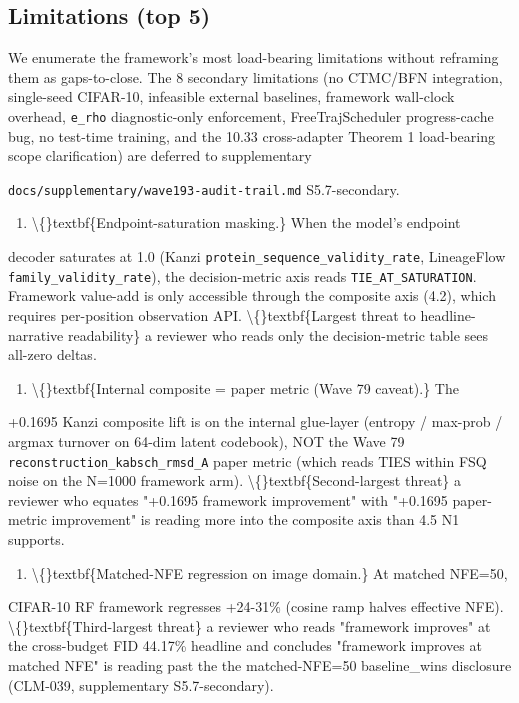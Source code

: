 \documentclass[preprint,3p,times,twocolumn]{elsarticle}
\begin{document}
\subsection{Limitations (top 5)}
We enumerate the framework's most load-bearing limitations without reframing them as gaps-to-close. The 8 secondary limitations (no CTMC/BFN integration, single-seed CIFAR-10, infeasible external baselines, framework wall-clock overhead, \texttt{e\_rho} diagnostic-only enforcement, FreeTrajScheduler progress-cache bug, no test-time training, and the 10.33 cross-adapter Theorem 1 load-bearing scope clarification) are deferred to supplementary

\texttt{docs/supplementary/wave193-audit-trail.md} S5.7-secondary.

\begin{enumerate}
\item \textbackslash\{\}textbf\{Endpoint-saturation masking.\} When the model's endpoint
\end{enumerate}
decoder saturates at 1.0 (Kanzi \texttt{protein\_sequence\_validity\_rate}, LineageFlow \texttt{family\_validity\_rate}), the decision-metric axis reads \texttt{TIE\_AT\_SATURATION}. Framework value-add is only accessible through the composite axis (4.2), which requires per-position observation API. \textbackslash\{\}textbf\{Largest threat to headline-narrative readability\}  a reviewer who reads only the decision-metric table sees all-zero deltas.

\begin{enumerate}
\item \textbackslash\{\}textbf\{Internal composite = paper metric (Wave 79 caveat).\} The
\end{enumerate}
+0.1695 Kanzi composite lift is on the internal glue-layer (entropy / max-prob / argmax turnover on 64-dim latent codebook), NOT the Wave 79 \texttt{reconstruction\_kabsch\_rmsd\_A} paper metric (which reads TIES within FSQ noise on the N=1000 framework arm). \textbackslash\{\}textbf\{Second-largest threat\}  a reviewer who equates "+0.1695 framework improvement" with "+0.1695 paper-metric improvement" is reading more into the composite axis than 4.5 N1 supports.

\begin{enumerate}
\item \textbackslash\{\}textbf\{Matched-NFE regression on image domain.\} At matched NFE=50,
\end{enumerate}
CIFAR-10 RF framework regresses +24-31\% (cosine ramp halves effective NFE). \textbackslash\{\}textbf\{Third-largest threat\}  a reviewer who reads "framework improves" at the cross-budget FID 44.17\% headline and concludes "framework improves at matched NFE" is reading past the the matched-NFE=50 baseline\_wins disclosure (CLM-039, supplementary S5.7-secondary).
\end{document}
